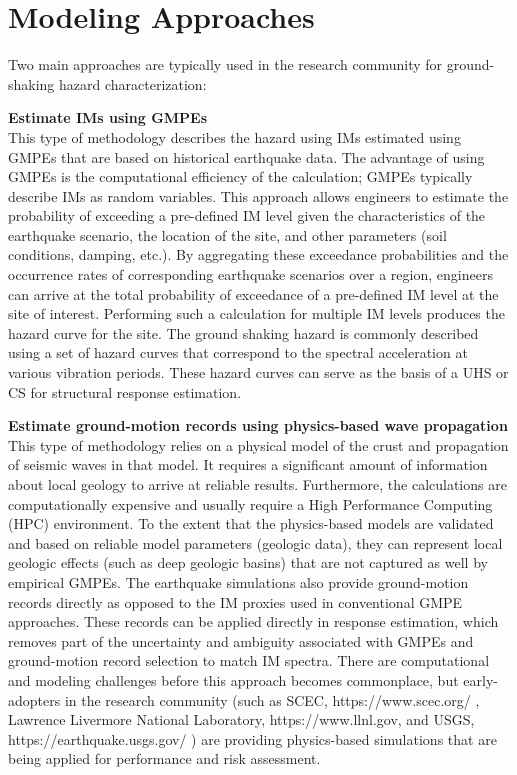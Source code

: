 \section{Modeling Approaches}
\label{sec:eq_shake_models}

Two main approaches are typically used in the research community for ground-shaking hazard characterization:
\newline

\noindent\textbf{Estimate IMs using GMPEs} \\This type of methodology describes the hazard using IMs estimated using GMPEs that are based on historical earthquake data. The advantage of using GMPEs is the computational efficiency of the calculation; GMPEs typically describe IMs as random variables. This approach allows engineers to estimate the probability of exceeding a pre-defined IM level given the characteristics of the earthquake scenario, the location of the site, and other parameters (soil conditions, damping, etc.). By aggregating these exceedance probabilities and the occurrence rates of corresponding earthquake scenarios over a region, engineers can arrive at the total probability of exceedance of a pre-defined IM level at the site of interest. Performing such a calculation for multiple IM levels produces the hazard curve for the site. The ground shaking hazard is commonly described using a set of hazard curves that correspond to the spectral acceleration at various vibration periods. These hazard curves can serve as the basis of a UHS or CS for structural response estimation.
\newline

\noindent\textbf{Estimate ground-motion records using physics-based wave propagation} \\This type of methodology relies on a physical model of the crust and propagation of seismic waves in that model. It requires a significant amount of information about local geology to arrive at reliable results. Furthermore, the calculations are computationally expensive and usually require a High Performance Computing (HPC) environment. To the extent that the physics-based models are validated and based on reliable model parameters (geologic data), they can represent local geologic effects (such as deep geologic basins) that are not captured as well by empirical GMPEs. The earthquake simulations also provide ground-motion records directly as opposed to the IM proxies used in conventional GMPE approaches. These records can be applied directly in response estimation, which removes part of the uncertainty and ambiguity associated with GMPEs and ground-motion record selection to match IM spectra. There are computational and modeling challenges before this approach becomes commonplace, but early-adopters in the research community (such as SCEC, https://www.scec.org/ , Lawrence Livermore National Laboratory, https://www.llnl.gov, and USGS, https://earthquake.usgs.gov/ ) are providing physics-based simulations that are being applied for performance and risk assessment.

